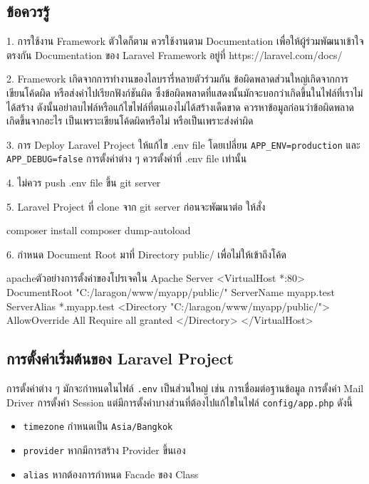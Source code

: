 \subsection{ข้อควรรู้}
1. การใช้งาน Framework ตัวใดก็ตาม ควรใช้งานตาม Documentation เพื่อให้ผู้ร่วมพัฒนาเข้าใจตรงกัน
Documentation ของ Laravel Framework อยู่ที่ https://laravel.com/docs/

2. Framework เกิดจากการทำงานของไลบรารี่หลายตัวร่วมกัน ข้อผิดพลาดส่วนใหญ่เกิดจากการเขียนโค้ดผิด 
หรือส่งค่าไปเรียกฟังก์ชันผิด ซึ่งข้อผิดพลาดที่แสดงนั้นมักจะบอกว่าเกิดขึ้นในไฟล์ที่เราไม่ได้สร้าง 
ดังนั้นอย่าลบไฟล์หรือแก้ไขไฟล์ที่ตนเองไม่ได้สร้างเด็ดขาด ควรหาข้อมูลก่อนว่าข้อผิดพลาดเกิดขึ้นจากอะไร 
เป็นเพราะเขียนโค้ดผิดหรือไม่ หรือเป็นเพราะส่งค่าผิด

3. การ Deploy Laravel Project ให้แก้ไข .env file โดยเปลี่ยน \texttt{APP_ENV=production} 
และ \texttt{APP_DEBUG=false} การตั้งค่าต่าง ๆ ควรตั้งค่าที่ .env file เท่านั้น

4. ไม่ควร push .env file ขึ้น git server

5. Laravel Project ที่ clone จาก git server ก่อนจะพัฒนาต่อ ให้สั่ง
\begin{cli}{}
    composer install
    composer dump-autoload
\end{cli}

6. กำหนด Document Root มาที่ Directory public/ เพื่อไม่ให้เข้าถึงโค้ด
\begin{code}{apache}{ตัวอย่างการตั้งค่าของโปรเจคใน Apache Server}{}
    <VirtualHost *:80> 
        DocumentRoot "C:/laragon/www/myapp/public/"
        ServerName myapp.test
        ServerAlias *.myapp.test
        <Directory "C:/laragon/www/myapp/public/">
            AllowOverride All
            Require all granted
        </Directory>
    </VirtualHost>
\end{code}

\subsection{การตั้งค่าเริ่มต้นของ Laravel Project}
การตั้งค่าต่าง ๆ มักจะกำหนดในไฟล์ \texttt{.env} เป็นส่วนใหญ่ เช่น การเชื่อมต่อฐานข้อมูล 
การตั้งค่า Mail Driver การตั้งค่า Session แต่มีการตั้งค่าบางส่วนที่ต้องไปแก้ไขในไฟล์ 
\texttt{config/app.php} ดังนี้
\begin{itemize}
    \item \texttt{timezone} กำหนดเป็น \texttt{Asia/Bangkok}
    \item \texttt{provider} หากมีการสร้าง Provider ขึ้นเอง
    \item \texttt{alias} หากต้องการกำหนด Facade ของ Class
\end{itemize}
